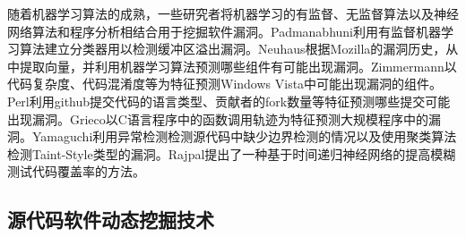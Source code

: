 随着机器学习算法的成熟，一些研究者将机器学习的有监督、无监督算法以及神经网络算法和程序分析相结合用于挖掘软件漏洞。Padmanabhuni利用有监督机器学习算法建立分类器用以检测缓冲区溢出漏洞。Neuhaus根据Mozilla的漏洞历史，从中提取向量，并利用机器学习算法预测哪些组件有可能出现漏洞。Zimmermann以代码复杂度、代码混淆度等为特征预测Windows Vista中可能出现漏洞的组件。Perl利用github提交代码的语言类型、贡献者的fork数量等特征预测哪些提交可能出现漏洞。Grieco以C语言程序中的函数调用轨迹为特征预测大规模程序中的漏洞。Yamaguchi利用异常检测检测源代码中缺少边界检测的情况以及使用聚类算法检测Taint-Style类型的漏洞。Rajpal提出了一种基于时间递归神经网络的提高模糊测试代码覆盖率的方法。


\subsection{源代码软件动态挖掘技术}


%

